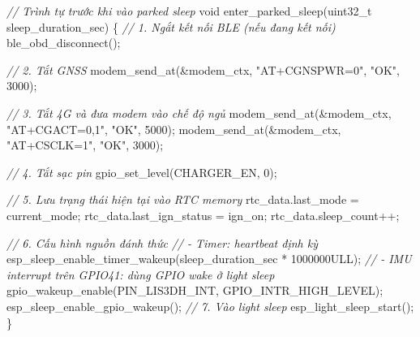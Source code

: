 \documentclass[a4paper]{extarticle}
\newenvironment{Shaded}{}{}
\newcommand{\BuiltInTok}[1]{\textcolor[rgb]{0.00,0.50,0.00}{#1}}
\newcommand{\CommentTok}[1]{\textcolor[rgb]{0.38,0.63,0.69}{\textit{#1}}}
\newcommand{\DataTypeTok}[1]{\textcolor[rgb]{0.56,0.13,0.00}{#1}}
\newcommand{\DecValTok}[1]{\textcolor[rgb]{0.25,0.63,0.44}{#1}}
\newcommand{\NormalTok}[1]{#1}
\newcommand{\OperatorTok}[1]{\textcolor[rgb]{0.40,0.40,0.40}{#1}}
\newcommand{\StringTok}[1]{\textcolor[rgb]{0.25,0.44,0.63}{#1}}
\begin{document}
\begin{Shaded}
\begin{Highlighting}[]
\CommentTok{// Trình tự trước khi vào parked sleep}
\DataTypeTok{void}\NormalTok{ enter\_parked\_sleep}\OperatorTok{(}\DataTypeTok{uint32\_t}\NormalTok{ sleep\_duration\_sec}\OperatorTok{)}
\OperatorTok{\{}
    \CommentTok{// 1. Ngắt kết nối BLE (nếu đang kết nối)}
\NormalTok{    ble\_obd\_disconnect}\OperatorTok{();}

    \CommentTok{// 2. Tắt GNSS}
\NormalTok{    modem\_send\_at}\OperatorTok{(\&}\NormalTok{modem\_ctx}\OperatorTok{,} \StringTok{"AT+CGNSPWR=0"}\OperatorTok{,} \StringTok{"OK"}\OperatorTok{,} \DecValTok{3000}\OperatorTok{);}

    \CommentTok{// 3. Tắt 4G và đưa modem vào chế độ ngủ}
\NormalTok{    modem\_send\_at}\OperatorTok{(\&}\NormalTok{modem\_ctx}\OperatorTok{,} \StringTok{"AT+CGACT=0,1"}\OperatorTok{,} \StringTok{"OK"}\OperatorTok{,} \DecValTok{5000}\OperatorTok{);}
\NormalTok{    modem\_send\_at}\OperatorTok{(\&}\NormalTok{modem\_ctx}\OperatorTok{,} \StringTok{"AT+CSCLK=1"}\OperatorTok{,} \StringTok{"OK"}\OperatorTok{,} \DecValTok{3000}\OperatorTok{);}

    \CommentTok{// 4. Tắt sạc pin}
\NormalTok{    gpio\_set\_level}\OperatorTok{(}\NormalTok{CHARGER\_EN}\OperatorTok{,} \DecValTok{0}\OperatorTok{);}

    \CommentTok{// 5. Lưu trạng thái hiện tại vào RTC memory}
\NormalTok{    rtc\_data}\OperatorTok{.}\NormalTok{last\_mode       }\OperatorTok{=}\NormalTok{ current\_mode}\OperatorTok{;}
\NormalTok{    rtc\_data}\OperatorTok{.}\NormalTok{last\_ign\_status }\OperatorTok{=}\NormalTok{ ign\_on}\OperatorTok{;}
\NormalTok{    rtc\_data}\OperatorTok{.}\NormalTok{sleep\_count}\OperatorTok{++;}

    \CommentTok{// 6. Cấu hình nguồn đánh thức}
    \CommentTok{//    {-} Timer: heartbeat định kỳ}
\NormalTok{    esp\_sleep\_enable\_timer\_wakeup}\OperatorTok{(}\NormalTok{sleep\_duration\_sec }\OperatorTok{*} \DecValTok{1000000}\BuiltInTok{ULL}\OperatorTok{);}
    \CommentTok{//    {-} IMU interrupt trên GPIO41: dùng GPIO wake ở light sleep}
\NormalTok{    gpio\_wakeup\_enable}\OperatorTok{(}\NormalTok{PIN\_LIS3DH\_INT}\OperatorTok{,}\NormalTok{ GPIO\_INTR\_HIGH\_LEVEL}\OperatorTok{);}
\NormalTok{    esp\_sleep\_enable\_gpio\_wakeup}\OperatorTok{();}
    \CommentTok{// 7. Vào light sleep}
\NormalTok{    esp\_light\_sleep\_start}\OperatorTok{();}
\OperatorTok{\}}
\end{Highlighting}
\end{Shaded}
\end{document}
